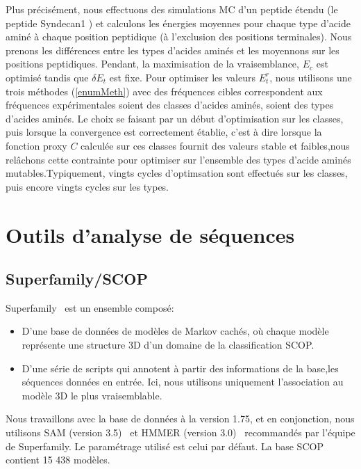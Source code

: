 Plus précisément, nous effectuons des simulations MC d'un peptide étendu (le peptide Syndecan1 ) et calculons les énergies moyennes pour chaque type d'acide aminé à chaque position peptidique (à l'exclusion des positions terminales). Nous prenons les différences entre les types d'acides aminés et les moyennons sur les positions peptidiques.
Pendant, la maximisation de la vraisemblance, $E_c$ est optimisé tandis que $\delta E_t$ est fixe. Pour optimiser les valeurs $E^r_t$, nous utilisons une trois méthodes (\ref{enumMeth}) avec des fréquences cibles correspondent aux fréquences expérimentales soient des classes d'acides aminés, soient des types d'acides aminés. Le choix se faisant par un début d'optimisation sur les classes, puis lorsque la convergence est correctement établie, c'est à dire  lorsque la fonction proxy $C$ calculée sur ces classes fournit des valeurs stable et faibles,nous relâchons cette contrainte pour optimiser sur l'ensemble des types d'acide aminés mutables.Typiquement, vingts cycles d'optimsation sont effectués sur les classes, puis encore vingts cycles sur les types.  



\section{Outils d'analyse de séquences} 
\subsection{Superfamily/SCOP}
\label{subsection:Superfamily}

Superfamily~\citep{refSuperfamily} est un ensemble composé: 

\begin{itemize}
\item D'une base de données de modèles de Markov cachés, où chaque modèle représente une structure 3D d'un domaine de la classification SCOP.
\item D'une série de scripts qui annotent à partir des informations de la base,les séquences données en entrée. Ici, nous utilisons uniquement l'association au modèle 3D le plus vraisemblable. 
\end{itemize}

Nous travaillons avec la base de données à la version 1.75, et en conjonction, nous utilisons SAM (version 3.5)~\citep{refSam} et HMMER (version 3.0)~\citep{refHmmer} recommandés par l'équipe de Superfamily. Le paramétrage utilisé est celui par défaut. La base SCOP contient 15 438 modèles.

